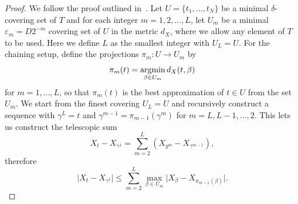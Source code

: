 \begin{proof}
We follow the proof outlined in~\cite[p. 140]{wainwright2019high}.
Let \( U = \{ t_{1}, \dots, t_{N} \} \) be a minimal $\delta$-covering set of $T$ and for each integer \( m=1,2, \dots, L \), let $U_{m}$ be a minimal \( \varepsilon_{m}= D 2^{-m} \) covering set of $U$ in the metric $d_{X}$, where we allow any element of $T$ to be used. Here we define $L$ as the smallest integer with \( U_{L}=U \).
For the chaining setup, define the projections \( \pi_{m} \colon U \to U_{m} \) by
\[
    \pi_{m}(t) = \operatorname*{argmin}_{\beta \in U_{m}} d_{X}(t,\beta)
\]
for \( m=1, \dots, L \), so that \( \pi_{m}(t) \) is the best approximation of \( t \in U \) from the set \( U_{m} \).
We start from the finest covering $U_{L}=U$ and recursively construct a sequence with \( \gamma^{L} = t \) and \( \gamma^{m-1} = \pi_{m-1}(\gamma^{m}) \) for
\( m= L,L-1, \dots, 2 \).
This lets us construct the telescopic sum
\[
    X_{t}-X_{\gamma^{1}} = \sum_{m=2}^{L} (X_{y^{m}}- X_{\gamma^{m-1}}),
\]
therefore
\[
    \lvert X_{t}-X_{\gamma^{1}} \rvert \leq \sum_{m=2}^{L} \max_{\beta \in U_{m}} \lvert X_{\beta}- X_{\pi_{m-1}(\beta)} \rvert.
\]


\end{proof}
